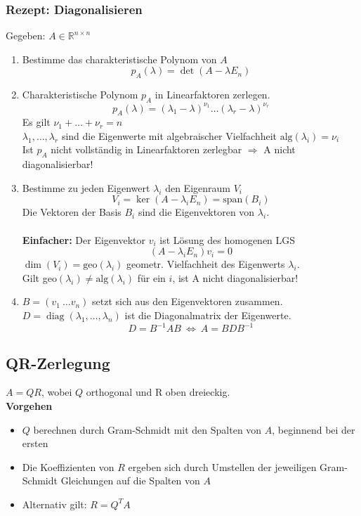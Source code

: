 \documentclass[6pt,a4paper]{scrartcl}
\DeclareMathOperator{\diag}{diag}
\begin{document}
\begin{multicols*}{4}
\subsubsection{Rezept: Diagonalisieren}
Gegeben: $A\in \mathbb{R}^{n\times n}$
\begin{enumerate}\itemsep0pt
\item Bestimme das charakteristische Polynom von $A$
\begin{equation*}
p_A(\lambda)=\det(A-\lambda E_n)
\end{equation*}
\item Charakteristische Polynom $p_A$ in Linearfaktoren zerlegen.
\begin{equation*}
p_A(\lambda)=(\lambda_1-\lambda)^{\nu_1}\dots(\lambda_r-\lambda)^{\nu_r}
\end{equation*}
Es gilt $\nu_1 + \dots + \nu_r=n$ \\
$\lambda_1,\dots, \lambda_r$ sind die Eigenwerte mit algebraischer Vielfachheit $\text{alg}(\lambda_i)=\nu_i$\\
Ist $p_A$ nicht vollständig in Linearfaktoren zerlegbar $\Rightarrow$ A nicht diagonalisierbar!
\item Bestimme zu jeden Eigenwert $\lambda_i$ den Eigenraum $V_i$
\begin{equation*}
V_i=\ker(A-\lambda_iE_n)=\text{span}(B_i)
\end{equation*}
Die Vektoren der Basis $B_i$ sind die Eigenvektoren von $\lambda_i$.\\ \\
\textbf{Einfacher:} Der Eigenvektor $v_i$ ist Lösung des homogenen LGS
\begin{equation*}
(A-\lambda_i E_n)v_i=0
\end{equation*}
$\dim(V_i)=\text{geo}(\lambda_i)$  geometr. Vielfachheit des Eigenwerts $\lambda_i$. \\
Gilt geo$(\lambda_i)\ne\text{alg}(\lambda_i)$ für ein $i$, ist A nicht diagonalisierbar!
\item $B=(v_1 \ \dots v_n)$ setzt sich aus den Eigenvektoren zusammen. \\
$D=\diag(\lambda_1,\dots,\lambda_n)$ ist die Diagonalmatrix der Eigenwerte.
\begin{equation*}
D=B^{-1}AB \ \Leftrightarrow \ A=BDB^{-1}
\end{equation*}
\end{enumerate}
\subsection{QR-Zerlegung}
$A = QR$, wobei $Q$ orthogonal und R oben dreieckig.\\
\textbf{Vorgehen}
\begin{itemize}\itemsep0pt
 \item $Q$ berechnen durch Gram-Schmidt mit den Spalten von $A$, beginnend bei der ersten
 \item Die Koeffizienten von $R$ ergeben sich durch Umstellen der jeweiligen Gram-Schmidt Gleichungen auf die Spalten von $A$
 \item Alternativ gilt: $R = Q^TA$
\end{itemize}


\end{multicols*}
\end{document}
